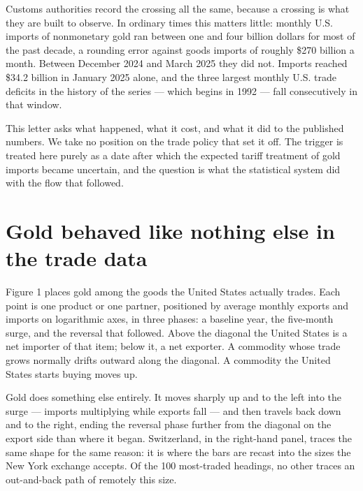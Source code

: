 \documentclass[11pt]{article}
\begin{document}
Customs authorities record the crossing all the same, because a crossing is what
they are built to observe. In ordinary times this matters little: monthly U.S.
imports of nonmonetary gold ran between one and four billion dollars for most of
the past decade, a rounding error against goods imports of roughly \$270 billion
a month. Between December 2024 and March 2025 they did not. Imports reached
\$34.2 billion in January 2025 alone, and the three largest monthly U.S. trade
deficits in the history of the series --- which begins in 1992 --- fall
consecutively in that window.

This letter asks what happened, what it cost, and what it did to the published
numbers. We take no position on the trade policy that set it off. The trigger is
treated here purely as a date after which the expected tariff treatment of gold
imports became uncertain, and the question is what the statistical system did
with the flow that followed.

\section{Gold behaved like nothing else in the trade data}

Figure 1 places gold among the goods the United States actually trades. Each
point is one product or one partner, positioned by average monthly exports and
imports on logarithmic axes, in three phases: a baseline year, the five-month
surge, and the reversal that followed. Above the diagonal the United States is a
net importer of that item; below it, a net exporter. A commodity whose trade
grows normally drifts outward along the diagonal. A commodity the United States
starts buying moves up.

Gold does something else entirely. It moves sharply up and to the left into the
surge --- imports multiplying while exports fall --- and then travels back down
and to the right, ending the reversal phase further from the diagonal on the
export side than where it began. Switzerland, in the right-hand panel, traces
the same shape for the same reason: it is where the bars are recast into the
sizes the New York exchange accepts. Of the 100 most-traded headings, no other traces an out-and-back path of
remotely this size.
\end{document}
